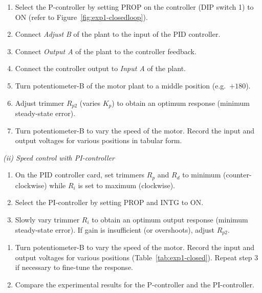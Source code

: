\begin{procedure}
  \begin{enumerate}
    \item Select the P-controller by setting PROP on the controller (DIP switch 1) to ON (refer to Figure~\ref{fig:exp1-closedloop}).
    \item Connect \textit{Adjust B} of the plant to the input of the PID controller.
    \item Connect \textit{Output A} of the plant to the controller feedback.
    \item Connect the controller output to \textit{Input A} of the plant.
    \item Turn potentiometer-B of the motor plant to a middle position (e.g.\ $+180$).
    \item Adjust trimmer $R_{p2}$ (varies $K_p$) to obtain an optimum response (minimum steady-state error).
    \item Turn potentiometer-B to vary the speed of the motor. Record the input and output voltages for various positions in tabular form.
  \end{enumerate}
  \vspace*{1.5em}

  \textit{(ii) Speed control with PI-controller}\vspace{2pt}

  \begin{enumerate}
    \item On the PID controller card, set trimmers $R_p$ and $R_d$ to minimum (counter-clockwise) while $R_i$ is set to maximum (clockwise).
    \item Select the PI-controller by setting PROP and INTG to ON.
    \item Slowly vary trimmer $R_i$ to obtain an optimum output response (minimum steady-state error). If gain is insufficient (or overshoots), adjust $R_{p2}$.
  \end{enumerate}
  \newpage

  \begin{enumerate}[resume]
    \item Turn potentiometer-B to vary the speed of the motor. Record the input and output voltages for various positions (Table~\ref{tab:exp1-closed}). Repeat step 3 if necessary to fine-tune the response.
    \item Compare the experimental results for the P-controller and the PI-controller.
  \end{enumerate}
  \vspace*{1.5em}


\end{procedure}
